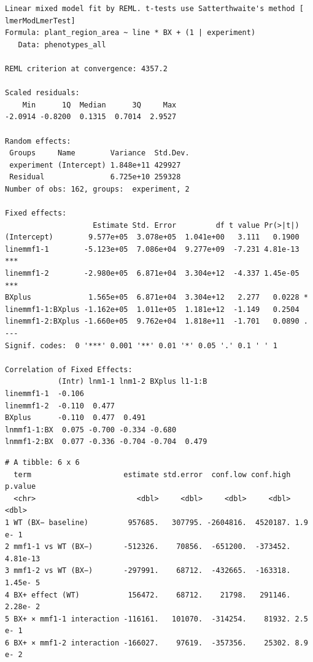 \documentclass[
  10pt,
]{article}
\begin{document}
\begin{verbatim}
Linear mixed model fit by REML. t-tests use Satterthwaite's method [
lmerModLmerTest]
Formula: plant_region_area ~ line * BX + (1 | experiment)
   Data: phenotypes_all

REML criterion at convergence: 4357.2

Scaled residuals: 
    Min      1Q  Median      3Q     Max 
-2.0914 -0.8200  0.1315  0.7014  2.9527 

Random effects:
 Groups     Name        Variance  Std.Dev.
 experiment (Intercept) 1.848e+11 429927  
 Residual               6.725e+10 259328  
Number of obs: 162, groups:  experiment, 2

Fixed effects:
                    Estimate Std. Error         df t value Pr(>|t|)    
(Intercept)        9.577e+05  3.078e+05  1.041e+00   3.111   0.1900    
linemmf1-1        -5.123e+05  7.086e+04  9.277e+09  -7.231 4.81e-13 ***
linemmf1-2        -2.980e+05  6.871e+04  3.304e+12  -4.337 1.45e-05 ***
BXplus             1.565e+05  6.871e+04  3.304e+12   2.277   0.0228 *  
linemmf1-1:BXplus -1.162e+05  1.011e+05  1.181e+12  -1.149   0.2504    
linemmf1-2:BXplus -1.660e+05  9.762e+04  1.818e+11  -1.701   0.0890 .  
---
Signif. codes:  0 '***' 0.001 '**' 0.01 '*' 0.05 '.' 0.1 ' ' 1

Correlation of Fixed Effects:
            (Intr) lnm1-1 lnm1-2 BXplus l1-1:B
linemmf1-1  -0.106                            
linemmf1-2  -0.110  0.477                     
BXplus      -0.110  0.477  0.491              
lnmmf1-1:BX  0.075 -0.700 -0.334 -0.680       
lnmmf1-2:BX  0.077 -0.336 -0.704 -0.704  0.479
\end{verbatim}

\begin{verbatim}
# A tibble: 6 x 6
  term                     estimate std.error  conf.low conf.high  p.value
  <chr>                       <dbl>     <dbl>     <dbl>     <dbl>    <dbl>
1 WT (BX− baseline)         957685.   307795. -2604816.  4520187. 1.9 e- 1
2 mmf1-1 vs WT (BX−)       -512326.    70856.  -651200.  -373452. 4.81e-13
3 mmf1-2 vs WT (BX−)       -297991.    68712.  -432665.  -163318. 1.45e- 5
4 BX+ effect (WT)           156472.    68712.    21798.   291146. 2.28e- 2
5 BX+ × mmf1-1 interaction -116161.   101070.  -314254.    81932. 2.5 e- 1
6 BX+ × mmf1-2 interaction -166027.    97619.  -357356.    25302. 8.9 e- 2
\end{verbatim}
\end{document}

